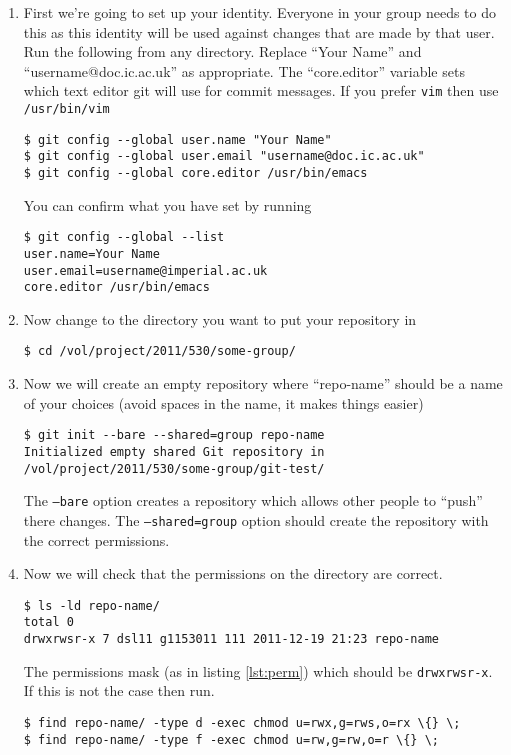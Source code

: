 \documentclass[a4paper,10pt,fleqn]{article}
\begin{document}
		\begin{enumerate}
		\item First we're going to set up your identity. Everyone in your group needs to do this as this identity will be used against changes that are made by that user. Run the following from any directory. Replace ``Your Name'' and ``username@doc.ic.ac.uk'' as appropriate. The ``core.editor'' variable sets which text editor git will use for commit messages. If you prefer \texttt{vim} then use \texttt{/usr/bin/vim}
			\begin{lstlisting}
$ git config --global user.name "Your Name"
$ git config --global user.email "username@doc.ic.ac.uk"
$ git config --global core.editor /usr/bin/emacs
		\end{lstlisting}

		You can confirm what you have set by running
			\begin{lstlisting}
$ git config --global --list
user.name=Your Name
user.email=username@imperial.ac.uk
core.editor /usr/bin/emacs
		\end{lstlisting}
		
		\item Now change to the directory you want to put your repository in
		\begin{lstlisting}
$ cd /vol/project/2011/530/some-group/
		\end{lstlisting}

		\item Now we will create an empty repository where ``repo-name'' should be a name of your choices (avoid spaces in the name, it makes things easier)
		\begin{lstlisting}
$ git init --bare --shared=group repo-name
Initialized empty shared Git repository in /vol/project/2011/530/some-group/git-test/
		\end{lstlisting}
		The \texttt{--bare} option creates a repository which allows other people to ``push'' there changes. The \texttt{--shared=group} option should create the repository with the correct permissions.

		\item Now we will check that the permissions on the directory are correct.
		\begin{lstlisting}[caption={Checking permissions},label={lst:perm}]
$ ls -ld repo-name/
total 0
drwxrwsr-x 7 dsl11 g1153011 111 2011-12-19 21:23 repo-name
		\end{lstlisting}

		The permissions mask (as in listing \ref{lst:perm}) which should be \texttt{drwxrwsr-x}. If this is not the case then run.
		\begin{lstlisting}
$ find repo-name/ -type d -exec chmod u=rwx,g=rws,o=rx \{} \;
$ find repo-name/ -type f -exec chmod u=rw,g=rw,o=r \{} \;
		\end{lstlisting}


\end{enumerate}
\end{document}

